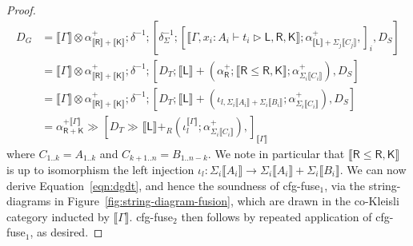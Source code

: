 \documentclass[acmsmall,screen,review]{acmart}
\newcommand{\ms}[1]{\ensuremath{\mathsf{#1}}}
\newcommand{\bhyp}[2]{#1 : #2}
\newcommand{\haslb}[3]{#1 \vdash #2 \rhd #3}
\newcommand{\brle}[1]{{\textsf{#1}}}
\newcommand{\dnt}[1]{\llbracket{#1}\rrbracket}
\newcommand{\rseq}[3]{#2 \gg_{#1} #3}
\newcommand{\envcop}[3]{[#2, #3]_{#1}}
\begin{document}
\begin{proof}
\begin{equation}
    \begin{aligned}
      D_G 
      & = \dnt{\Gamma} \otimes \alpha^+_{\dnt{\ms{R}} + \dnt{\ms{K}}} ; \delta^{-1} ; [
        \delta^{-1}_\Sigma ; [
          \dnt{\haslb{\Gamma, \bhyp{x_i}{A_i}}{t_i}{\ms{L}, \ms{R}, \ms{K}}}
          ; \alpha^+_{\dnt{\ms{L}} + \Sigma_j\dnt{C_j}},
        ]_i,
        D_S
      ] \\
      & = \dnt{\Gamma} \otimes \alpha^+_{\dnt{\ms{R}} + \dnt{\ms{K}}} ; \delta^{-1} ; [
        D_T ; \dnt{\ms{L}} 
          + (\alpha^+_{\ms{R}} ; \dnt{\ms{R} \leq \ms{R, K}} ; \alpha^+_{\Sigma_i\dnt{C_i}}),
        D_S
      ] \\
      & = \dnt{\Gamma} \otimes \alpha^+_{\dnt{\ms{R}} + \dnt{\ms{K}}} ; \delta^{-1} ; [
        D_T ; \dnt{\ms{L}} 
          + (\iota_{l, \Sigma_i\dnt{A_i} + \Sigma_i\dnt{B_i}} ; \alpha^+_{\Sigma_i\dnt{C_i}}),
        D_S
      ] \\
      & = \rseq{}{\alpha^{+\dnt{\Gamma}}_{\ms{R} + \ms{K}}}{\envcop{\dnt{\Gamma}}
        {\rseq{}{D_T}{\dnt{\ms{L}} +_R (\iota_l^{\dnt{\Gamma}} ; \alpha^+_{\Sigma_i\dnt{C_i}})}}
        {}}
    \end{aligned}
    \label{eqn:dg-rhs}
  \end{equation}
  where $C_{1..k} = A_{1..k}$ and $C_{k+1..n} = B_{1..n-k}$. We note in particular that $\dnt{\ms{R}
  \leq \ms{R, K}}$ is up to isomorphism the left injection $\iota_l : \Sigma_i\dnt{A_i} \to
  \Sigma_i\dnt{A_i} + \Sigma_i\dnt{B_i}$. We can now derive Equation~\ref{eqn:dgdt}, and hence the
  soundness of \brle{cfg-fuse$_1$}, via the string-diagrams in
  Figure~\ref{fig:string-diagram-fusion}, which are drawn in the co-Kleisli category inducted by
  $\dnt{\Gamma}$. \brle{cfg-fuse$_2$} then follows by repeated application of \brle{cfg-fuse$_1$}, as
  desired.
\end{proof}
\end{document}
